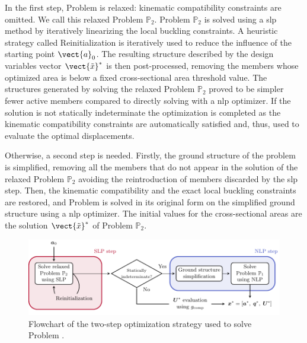 In the first step, Problem  is relaxed: kinematic compatibility constraints are omitted. We call this relaxed Problem $\mathbb{P}_2$. Problem $\mathbb{P}_2$ is solved using a \gls{slp} method by iteratively linearizing the local buckling constraints. A heuristic strategy called Reinitialization is iteratively used to reduce the influence of the starting point $\vect{a}_0$. The resulting structure described by the design variables vector $\vect{\tilde{x}}^*$ is then post-processed, removing the members whose optimized area is below a fixed cross-sectional area threshold value. The structures generated by solving the relaxed Problem $\mathbb{P}_2$ proved to be simpler \ie fewer active members compared to directly solving  with a \gls{nlp} optimizer. If the solution is not statically indeterminate the optimization is completed as the kinematic compatibility constraints  are automatically satisfied and, thus, used to evaluate the optimal displacements.

Otherwise, a second step is needed. Firstly, the ground structure of the problem is simplified, removing all the members that do not appear in the solution of the relaxed Problem $\mathbb{P}_2$ \ie avoiding the reintroduction of members discarded by the \gls{slp} step. Then, the kinematic compatibility and the exact local buckling constraints are restored, and Problem  is solved in its original form on the simplified ground structure using a \gls{nlp} optimizer. The initial values for the cross-sectional areas are the solution $\vect{\tilde{x}}^*$ of Problem $\mathbb{P}_2$.

\begin{figure}
    \centering
    \includegraphics[width=\linewidth]{figures/04_TTO_improvements/02_solution_algo/sol_algo.pdf}
    \caption{Flowchart of the two-step optimization strategy used to solve Problem .}
    \label{fig:04_sol_alg}
\end{figure}

